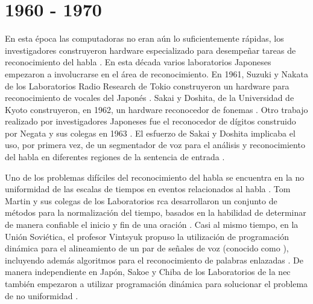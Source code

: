 \section{1960 - 1970}
\label{sec:60s}

En esta \'{e}poca las computadoras no eran a\'un lo suficientemente r\'{a}pidas, los investigadores
construyeron hardware especializado para desempe\~{n}ar tareas de reconocimiento del habla \cite{Furui50Years2004}.
En esta d\'{e}cada varios laboratorios Japoneses empezaron a involucrarse en el \'{a}rea de reconocimiento. En 1961,
Suzuki y Nakata de los Laboratorios Radio Research de Tokio construyeron un hardware para reconocimiento de vocales
del Japon\'{e}s \cite{SuzukiRecognition1961}. Sakai y Doshita, de la Universidad de Kyoto construyeron, en 1962, un
hardware reconocedor de fonemas \cite{SakaiThePhonetic1962}. Otro trabajo realizado por investigadores Japoneses fue
el reconocedor de d\'{i}gitos construido por Negata y sus colegas en 1963 \cite{NagataSpoken1963}. El esfuerzo de
Sakai y Doshita implicaba el uso, por primera vez, de un segmentador de voz para el an\'{a}lisis y reconocimiento
del habla en diferentes regiones de la sentencia de entrada \cite{JaisalAReview2012}.

Uno de los problemas dif\'{i}ciles del reconocimiento del habla se encuentra en la no uniformidad de las escalas de
tiempos en eventos relacionados al habla \cite{Furui50Years2004}. Tom Martin y sus colegas de los 
Laboratorios \gls{rca} desarrollaron un conjunto de m\'{e}todos para la normalizaci\'{o}n del tiempo, 
basados en la habilidad de determinar de manera confiable el inicio y fin de una oraci\'{o}n \cite{MartinSpeech1964}.
Casi al mismo tiempo, en la Uni\'{o}n Sovi\'{e}tica, el profesor Vintsyuk propuso la utilizaci\'{o}n de
programaci\'{o}n din\'{a}mica para el alineamiento de un par de se\~{n}ales de voz 
(conocido como ), incluyendo adem\'{a}s algoritmos para el reconocimiento de palabras 
enlazadas \cite{VintsyukSpeech1968}. De manera independiente en Jap\'{o}n, Sakoe y Chiba de los Laboratorios de la
\gls{nec} tambi\'{e}n empezaron a utilizar programaci\'{o}n din\'{a}mica para solucionar el problema de no uniformidad
\cite{SakoeDynamic1978}.
